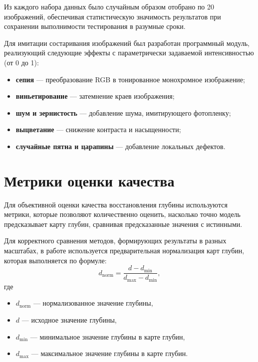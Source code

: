 Из каждого набора данных было случайным образом отобрано по 20 изображений,
обеспечивая статистическую значимость результатов при сохранении выполнимости тестирования в разумные сроки.

Для имитации состаривания изображений был разработан программный модуль, реализующий следующие эффекты с параметрически задаваемой интенсивностью (от 0 до 1):

\begin{itemize}
     \item \textbf{сепия} --- преобразование RGB в тонированное монохромное изображение;
     \item \textbf{виньетирование} --- затемнение краев изображения;
     \item \textbf{шум и зернистость} --- добавление шума, имитирующего фотопленку;
     \item \textbf{выцветание} --- снижение контраста и насыщенности;
     \item \textbf{случайные пятна и царапины} --- добавление локальных дефектов.
\end{itemize}

\section{Метрики оценки качества}

Для объективной оценки качества восстановления глубины используются метрики, которые позволяют количественно оценить,
насколько точно модель предсказывает карту глубин, сравнивая предсказанные значения с истинными.

Для корректного сравнения методов, формирующих результаты в разных масштабах, в работе используется предварительная нормализация карт глубин, которая выполняется по формуле:
\begin{equation}
    d_{\text{norm}} = \frac{d - d_{\text{min}}}{d_{\text{max}} - d_{\text{min}}},
\end{equation}
где
\begin{itemize}
    \item $d_{\text{norm}}$ --- нормализованное значение глубины,
    \item $d$ --- исходное значение глубины,
    \item $d_{\text{min}}$ --- минимальное значение глубины в карте глубин,
    \item $d_{\text{max}}$ --- максимальное значение глубины в карте глубин.
\end{itemize}

